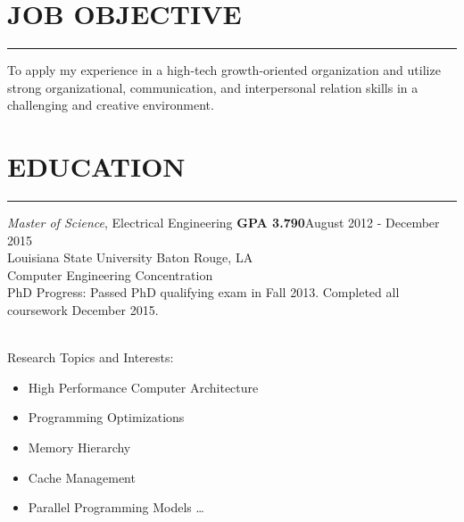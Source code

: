 \documentclass{res}
\begin{document}
 


\address{\bf  PRESENT ADDRESS\\Southlake Avenue\\Baton Rouge, LA 70804}  
\address{\bf PERMANENT ADDRESS \\Smith Drive\\  Walker , LA 70785}
                                  
\begin{resume}

\section{JOB OBJECTIVE}
	\rule{\textwidth}{0.5pt}
    To apply my experience in a high-tech growth-oriented organization and utilize strong organizational, communication, and interpersonal relation skills in a challenging and creative environment.      
    
\section{EDUCATION}
	\rule{\textwidth}{0.5pt}
	\vspace{-0.3in} 
	
	{\sl Master of Science}, Electrical Engineering {\bf GPA 3.790}\hfill August 2012 - December 2015\\ 
	Louisiana State University \hfill Baton Rouge, LA\\   
	{\footnotesize Computer Engineering Concentration\\
	PhD Progress: Passed PhD qualifying exam in Fall 2013. Completed all coursework  December 2015.}\\\\
	\vspace{-0.49in}
	\begin{multicols}{2}
	{\footnotesize 
		Research Topics and Interests: \vspace{-0.175in}
		\begin{itemize}
			\item High Performance Computer Architecture
			\item Programming Optimizations
			\item Memory Hierarchy
			\item Cache Management
			\item Parallel Programming Models \ldots
			\end{itemize}
		
}
\end{multicols}
\end{resume}
\end{document}
